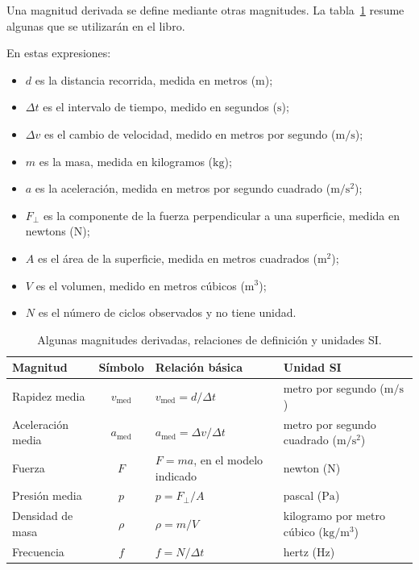 Una magnitud derivada se define mediante otras magnitudes. La tabla~\ref{tab:u1-magnitudes-derivadas} resume algunas que se utilizarán en el libro.

En estas expresiones:

\begin{itemize}
    \item \(d\) es la distancia recorrida, medida en metros (\(\text{m}\));
    \item \(\Delta t\) es el intervalo de tiempo, medido en segundos (\(\text{s}\));
    \item \(\Delta v\) es el cambio de velocidad, medido en metros por segundo (\(\text{m}/\text{s}\));
    \item \(m\) es la masa, medida en kilogramos (\(\text{kg}\));
    \item \(a\) es la aceleración, medida en metros por segundo cuadrado (\(\text{m}/\text{s}^{2}\));
    \item \(F_\perp\) es la componente de la fuerza perpendicular a una superficie, medida en newtons (\(\text{N}\));
    \item \(A\) es el área de la superficie, medida en metros cuadrados (\(\text{m}^{2}\));
    \item \(V\) es el volumen, medido en metros cúbicos (\(\text{m}^{3}\));
    \item \(N\) es el número de ciclos observados y no tiene unidad.
\end{itemize}

\begin{table}[htbp]
    \centering
    \setlength{\tabcolsep}{4pt}
    \begin{tabular}{|>{\raggedright\arraybackslash}p{}|c|>{\raggedright\arraybackslash}p{}|>{\raggedright\arraybackslash}p{}|}
        \hline
        \textbf{Magnitud} & \textbf{Símbolo} & \textbf{Relación básica} & \textbf{Unidad SI} \\
        \hline
        Rapidez media & \(v_\mathrm{med}\) & \(v_\mathrm{med}=d/\Delta t\) & metro por segundo (\(\text{m}/\text{s}\)) \\
        Aceleración media & \(a_\mathrm{med}\) & \(a_\mathrm{med}=\Delta v/\Delta t\) & metro por segundo cuadrado (\(\text{m}/\text{s}^{2}\)) \\
        Fuerza & \(F\) & \(F=ma\), en el modelo indicado & newton (\(\text{N}\)) \\
        Presión media & \(p\) & \(p=F_\perp/A\) & pascal (\(\text{Pa}\)) \\
        Densidad de masa & \(\rho\) & \(\rho=m/V\) & kilogramo por metro cúbico (\(\text{kg}/\text{m}^{3}\)) \\
        Frecuencia & \(f\) & \(f=N/\Delta t\) & hertz (\(\text{Hz}\)) \\
        \hline
    \end{tabular}
    \caption{Algunas magnitudes derivadas, relaciones de definición y unidades SI.}
    \label{tab:u1-magnitudes-derivadas}
\end{table}

